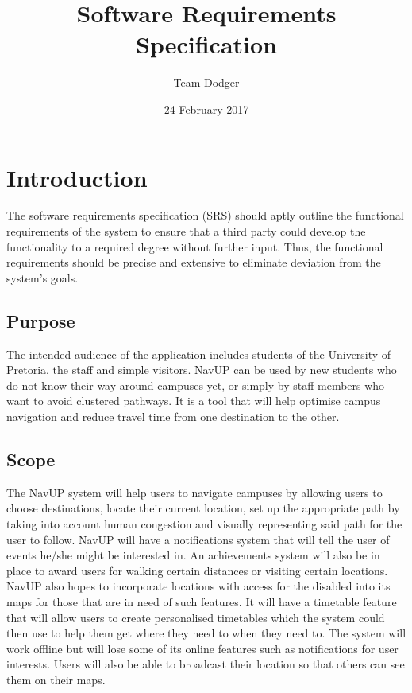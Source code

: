 \documentclass{article}
\title{Software Requirements Specification}
\date{24 February 2017}
\author{Team Dodger}
\begin{document}
	\maketitle
	\newpage
	\tableofcontents
	\newpage
	\listoffigures
 	\listoftables
 	\newpage
	
	\section{Introduction}
	The software requirements specification (SRS) should aptly outline the functional requirements of the system to ensure that a third party could develop the functionality to a required degree without further input. Thus, the functional requirements should be precise and extensive to eliminate deviation from the system’s goals.
	
	\subsection{Purpose}
	The intended audience of the application includes students of the University of Pretoria, the staff and simple visitors. NavUP can be used by new students who do not know their way around campuses yet, or simply by staff members who want to avoid clustered pathways. It is a tool that will help optimise campus navigation and reduce travel time from one destination to the other.
	
	\subsection{Scope}
	The NavUP system will help users to navigate campuses by allowing users to choose destinations, locate their current location, set up the appropriate path by taking into account human congestion and visually representing said path for the user to follow.
	NavUP will have a notifications system that will tell the user of events he/she might be interested in. An achievements system will also be in place to award users for walking certain distances or visiting certain locations.  NavUP also hopes to incorporate locations with access for the disabled into its maps for those that are in need of such features. It will have a timetable feature that will allow users to create personalised timetables which the system could then use to help them get where they need to when they need to. The system will work offline but will lose some of its online features such as notifications for user interests. Users will also be able to broadcast their location so that others can see them on their maps.
	
\end{document}
